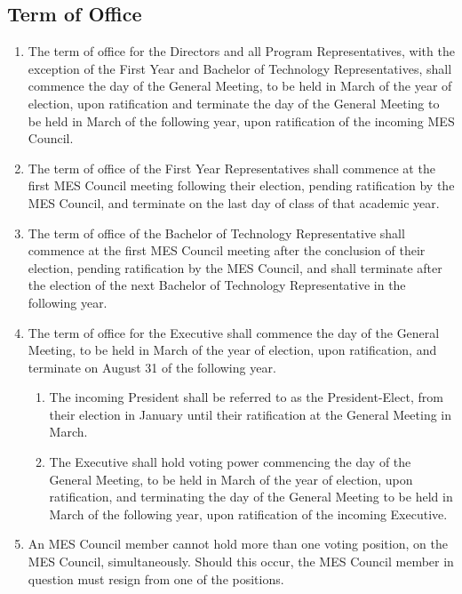 \subsection{Term of Office}
\label{term-of-office}
\begin{enumerate}
 \item
  The term of office for the Directors and all Program Representatives, with the exception of the First Year and Bachelor of Technology Representatives, shall commence the day of the General Meeting, to be held in March of the year of election, upon ratification and terminate the day of the General Meeting to be held in March of the following year, upon ratification of the incoming MES Council.
 \item
  The term of office of the First Year Representatives shall commence at the first MES Council meeting following their election, pending ratification by the MES Council, and terminate on the last day of class of that academic year.
 \item
  The term of office of the Bachelor of Technology Representative shall commence at the first MES Council meeting after the conclusion of their election, pending ratification by the MES Council, and shall terminate after the election of the next Bachelor of Technology Representative in the following year.
 \item
  The term of office for the Executive shall commence the day of the General Meeting, to be held in March of the year of election, upon ratification, and terminate on August 31 of the following year.
  \begin{enumerate}
   \item
    The incoming President shall be referred to as the President-Elect, from their election in January until their ratification at the General Meeting in March.
   \item
    The Executive shall hold voting power commencing the day of the General Meeting, to be held in March of the year of election, upon ratification, and terminating the day of the General Meeting to be held in March of the following year, upon ratification of the incoming Executive.
  \end{enumerate}

 \item
  An MES Council member cannot hold more than one voting position, on the MES Council, simultaneously. Should this occur, the MES Council member in question must resign from one of the positions.

\end{enumerate}
